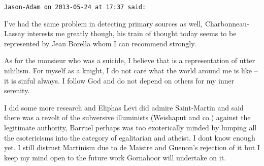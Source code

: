 \begin{footnotesize}
\begin{sffamily}
\hfill

\texttt{Jason-Adam on 2013-05-24 at 17:37 said: }

I've had the same problem in detecting primary sources as well, Charbonneau-Lassay interests me greatly though, his train of thought today seems to be represented by Jean Borella whom I can recommend strongly. 

As for the monsieur who was a suicide, I believe that is a representation of utter nihilism. For myself as a knight, I do not care what the world around me is like – it is sinful always. I follow God and do not depend on others for my inner serenity. 

I did some more research and Eliphas Levi did admire Saint-Martin and said there was a revolt of the subversive illuminists (Weishaput and co.) against the legitimate authority, Barruel perhaps was too exoterically minded by lumping all the esotericisms into the category of egalitarian and atheist. I dont know enough yet. I still distrust Martinism due to de Maistre and Guenon's rejection of it but I keep my mind open to the future work Gornahoor will undertake on it.


\end{sffamily}\end{footnotesize}
